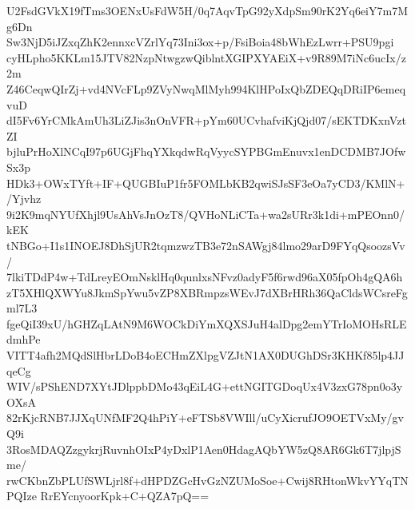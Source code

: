 U2FsdGVkX19fTms3OENxUsFdW5H/0q7AqvTpG92yXdpSm90rK2Yq6eiY7m7Mg6Dn
Sw3NjD5iJZxqZhK2ennxcVZrlYq73Ini3ox+p/FsiBoia48bWhEzLwrr+PSU9pgi
cyHLpho5KKLm15JTV82NzpNtwgzwQiblntXGIPXYAEiX+v9R89M7iNc6ucIx/z2m
Z46CeqwQIrZj+vd4NVcFLp9ZVyNwqMlMyh994KlHPoIxQbZDEQqDRiIP6emeqvuD
dI5Fv6YrCMkAmUh3LiZJis3nOnVFR+pYm60UCvhafviKjQjd07/sEKTDKxnVztZI
bjluPrHoXlNCqI97p6UGjFhqYXkqdwRqVyycSYPBGmEnuvx1enDCDMB7JOfwSx3p
HDk3+OWxTYft+IF+QUGBIuP1fr5FOMLbKB2qwiSJsSF3eOa7yCD3/KMlN+/Yjvhz
9i2K9mqNYUfXhjl9UsAhVsJnOzT8/QVHoNLiCTa+wa2sURr3k1di+mPEOnn0/kEK
tNBGo+I1s1INOEJ8DhSjUR2tqmzwzTB3e72nSAWgj84lmo29arD9FYqQsoozsVv/
7lkiTDdP4w+TdLreyEOmNsklHq0qunlxsNFvz0adyF5f6rwd96aX05fpOh4gQA6h
zT5XHlQXWYu8JkmSpYwu5vZP8XBRmpzsWEvJ7dXBrHRh36QaCldsWCsreFgml7L3
fgeQiI39xU/hGHZqLAtN9M6WOCkDiYmXQXSJuH4alDpg2emYTrIoMOHsRLEdmhPe
VITT4afh2MQdSlHbrLDoB4oECHmZXlpgVZJtN1AX0DUGhDSr3KHKf85lp4JJqeCg
WIV/sPShEND7XYtJDlppbDMo43qEiL4G+ettNGITGDoqUx4V3zxG78pn0o3yOXsA
82rKjcRNB7JJXqUNfMF2Q4hPiY+eFTSb8VWIll/uCyXicrufJO9OETVxMy/gvQ9i
3RosMDAQZzgykrjRuvnhOIxP4yDxlP1Aen0HdagAQbYW5zQ8AR6Gk6T7jlpjSme/
rwCKbnZbPLUfSWLjrl8f+dHPDZGcHvGzNZUMoSoe+Cwij8RHtonWkvYYqTNPQIze
RrEYcnyoorKpk+C+QZA7pQ==
